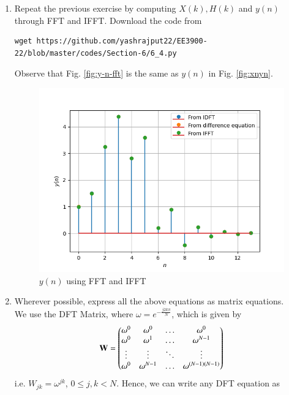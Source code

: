 \documentclass[journal,12pt,twocolumn]{IEEEtran}
\renewcommand\thesection{\arabic{section}}
\begin{document}
\begin{enumerate}[label=\thesection.\arabic*]
\item Repeat the previous exercise by computing $X(k), H(k)$ and $y(n)$ through FFT and 
IFFT.
\solution Download the code from
\\
\begin{lstlisting}
wget https://github.com/yashrajput22/EE3900-22/blob/master/codes/Section-6/6_4.py
\end{lstlisting}
Observe that Fig. \eqref{fig:y-n-fft} is the same as $y(n)$ in Fig. \eqref{fig:xnyn}.
\begin{figure}
	\centering
	\includegraphics[width=\columnwidth]{./figs/6_4.png}
	\caption{$y(n)$ using FFT and IFFT}
	\label{fig:y-n-fft}
\end{figure}
\item Wherever possible, express all the above equations as matrix equations.
\\
\solution
We use the DFT Matrix, where $\omega = e^{-\frac{j2k\pi}{N}}$, which is given by
\begin{align}
	\mathbf{W} = 
	\begin{pmatrix}
		\omega^0 & \omega^0 & \ldots & \omega^0 \\
		\omega^0 & \omega^1 & \ldots & \omega^{N - 1} \\
		\vdots & \vdots & \ddots & \vdots \\
		\omega^0 & \omega^{N - 1} & \ldots & \omega^{(N -1)(N - 1)}
	\end{pmatrix}
\end{align}
i.e. $W_{jk} = \omega^{jk}$, $0 \leq j, k < N$. Hence, we can write any DFT equation as
\begin{align}

\end{align}
\end{enumerate}
\end{document}
